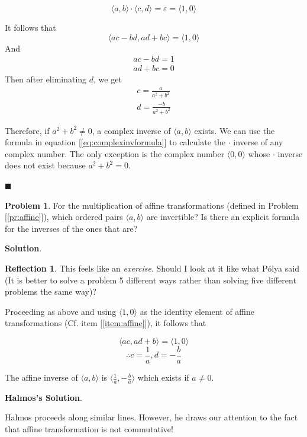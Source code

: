 \documentclass[english,notitlepage,smartquotes]{hgbreport}
\theoremstyle{definition}
\theoremstyle{definition}
\newtheorem{problem}{Problem}
\theoremstyle{remark}
\theoremstyle{plain}
\theoremstyle{definition}
\renewcommand\qedsymbol{$\blacksquare$}
\theoremstyle{definition}
\newtheorem{reflection}{Reflection}
\begin{document}
$$
\langle a,b\rangle\cdot\langle c,d\rangle=\varepsilon=\langle 1,0\rangle
$$

It follows that 
$$
\langle ac-bd,ad+bc\rangle=\langle1,0\rangle
$$
And
\begin{equation}
\!
\begin{aligned}
ac-bd=1 \\
ad+bc=0
\end{aligned}\label{eq:complexinv1}
\end{equation}
Then after eliminating $d$, we get
\begin{equation}
\!
\begin{aligned}
c=\frac{a}{a^2+b^2} \\
d=\frac{-b}{a^2+b^2}
\end{aligned}\label{eq:complexinvformula}
\end{equation}

Therefore, if ${a^2+b^2}\ne 0$, a complex inverse of $\langle a,b\rangle$ exists. We can use the formula in equation [\ref{eq:complexinvformula}] to calculate the $\cdot$ inverse of any complex number. The only exception is the complex number $\langle 0,0\rangle$ whose $\cdot$ inverse does not exist because $a^2+b^2=0$.

\qedsymbol

\begin{problem}
\label{pr:affineinv}
For the multiplication of affine transformations (defined in Problem [\ref{pr:affine}]), which ordered pairs $\langle a,b\rangle$ are invertible? Is there an explicit formula for the inverses of the ones that are?
\end{problem}

\textbf{Solution}.
\begin{reflection}
This feels like an \emph{exercise}. Should I look at it like what P\'{o}lya said (It is better to solve a problem 5 different ways rather than solving five different problems the same way)?
\end{reflection}
Proceeding as above and using $\langle 1,0\rangle$ as the identity element of affine transformations (Cf. item [\ref{item:affine}]), it follows that

$$
\langle ac,ad+b\rangle=\langle 1,0\rangle
$$
$$
\therefore c=\frac{1}{a}, d=-\frac{b}{a}
$$

The affine inverse of $\langle a,b\rangle$ is $\langle\frac{1}{a},-\frac{b}{a}\rangle$ which exists if $a\ne 0$.

\textbf{Halmos's Solution}.

Halmos proceeds along similar lines. However, he draws our attention to the fact that affine transformation is not commutative! 
\end{document}
